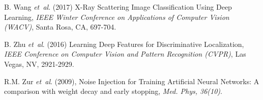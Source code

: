 \documentclass{bioinfo}
\begin{document}
\begin{thebibliography}{}
B. Wang {\it et~al}. (2017) X-Ray Scattering Image Classification Using Deep Learning, {\it IEEE Winter Conference on Applications of Computer Vision (WACV)}, Santa Rosa, CA,  697-704.


B. Zhu {\it et~al}. (2016) Learning Deep Features for Discriminative Localization, {\it IEEE Conference on Computer Vision and Pattern Recognition (CVPR)}, Las Vegas, NV, 2921-2929.

R.M. Zur {\it et~al}. (2009), Noise Injection for Training Artificial Neural Networks: A comparison with weight decay and early stopping, {\it Med. Phys, 36(10)}.


\end{thebibliography}
\end{document}
